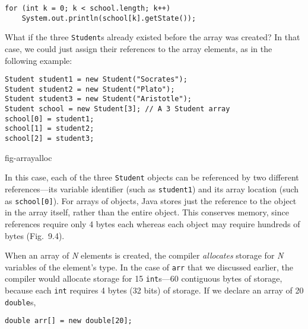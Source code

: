 \begin{jjjlisting}
\begin{lstlisting}
for (int k = 0; k < school.length; k++)
    System.out.println(school[k].getState());
\end{lstlisting}
\end{jjjlisting}

What if the three {\tt Student}s already existed before the array was
created? In that case, we could just assign their references to the
array elements, as in the following example:

\begin{jjjlisting}
\begin{lstlisting}
Student student1 = new Student("Socrates"); 
Student student2 = new Student("Plato");
Student student3 = new Student("Aristotle");
Student school = new Student[3]; // A 3 Student array
school[0] = student1;
school[1] = student2;
school[2] = student3;
\end{lstlisting}
\end{jjjlisting}
{fig-arrayalloc}

\noindent In this case, each of the three {\tt Student} objects
can be referenced by two different references---its variable
identifier (such as {\tt student1}) and its array location (such as
{\tt school[0]}).  For arrays of objects, Java stores just the reference to
the object in the array itself, rather than the entire object.  This
conserves memory, since references require only 4 bytes each whereas
each object may require hundreds of bytes (Fig.~9.4).

When an array of {\it N} elements is
created, the compiler {\it allocates} storage for {\it N} variables of
the element's type.  In the case of {\tt arr} that we discussed
earlier, the compiler would allocate storage for 15 {\tt int}s---60
contiguous bytes of storage, because each {\tt int} requires 4 bytes
(32 bits) of storage.  If we declare an array of 20 {\tt double}s,

\begin{jjjlisting}
\begin{lstlisting}
double arr[] = new double[20];
\end{lstlisting}
\end{jjjlisting}

